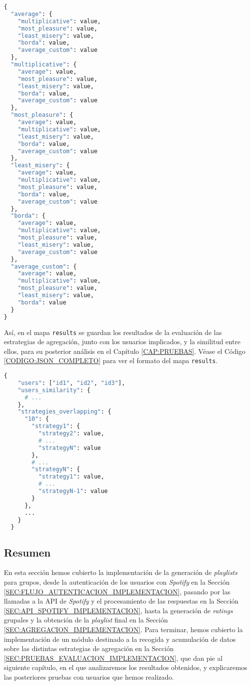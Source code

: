 \begin{lstlisting}[language=python, caption=Diccionario de similitud entre estrategias para una duración, label=CODIGO:SIMILITUD_ESTRATEGIAS]
{
  "average": {
    "multiplicative": value,
    "most_pleasure": value,
    "least_misery": value,
    "borda": value,
    "average_custom": value
  },
  "multiplicative": {
    "average": value,
    "most_pleasure": value,
    "least_misery": value,
    "borda": value,
    "average_custom": value
  },
  "most_pleasure": {
    "average": value,
    "multiplicative": value,
    "least_misery": value,
    "borda": value,
    "average_custom": value
  },
  "least_misery": {
    "average": value,
    "multiplicative": value,
    "most_pleasure": value,
    "borda": value,
    "average_custom": value
  },
  "borda": {
    "average": value,
    "multiplicative": value,
    "most_pleasure": value,
    "least_misery": value,
    "average_custom": value
  },
  "average_custom": {
    "average": value,
    "multiplicative": value,
    "most_pleasure": value,
    "least_misery": value,
    "borda": value
  }
}

\end{lstlisting}

Así, en el mapa \texttt{results} se guardan los resultados de la evaluación de las estrategias de agregación, junto con los usuarios 
implicados, y la similitud entre ellos, para su posterior análisis en el Capítulo \ref{CAP:PRUEBAS}. Véase el Código \ref{CODIGO:JSON_COMPLETO}
para ver el formato del mapa \texttt{results}.

\begin{lstlisting}[language=python, caption=Formato del mapa \texttt{results}, label=CODIGO:JSON_COMPLETO]
  {
    "users": ["id1", "id2", "id3"],
    "users_similarity": {
      # ...
    },
    "strategies_overlapping": {
      "10": {
        "strategy1": {
          "strategy2": value, 
          # ...
          "strategyN": value
        },
        # ...
        "strategyN": {
          "strategy1": value, 
          # ...
          "strategyN-1": value
        }
      },
      ...
    }
  }
\end{lstlisting}

\subsection{Resumen}

En esta sección hemos cubierto la implementación de la generación de \textit{playlists} para grupos, desde la autenticación de los usuarios
con \textit{Spotify} en la Sección \ref{SEC:FLUJO_AUTENTICACION_IMPLEMENTACION}, pasando por las llamadas a la API de \textit{Spotify} y el procesamiento de las respuestas
en la Sección \ref{SEC:API_SPOTIFY_IMPLEMENTACION}, hasta la generación de \textit{ratings} grupales y la obtención de la \textit{playlist} final en la Sección \ref{SEC:AGREGACION_IMPLEMENTACION}.
Para terminar, hemos cubierto la implementación de un módulo destinado a la recogida y acumulación de datos sobre las distintas estrategias de agregación en la 
Sección \ref{SEC:PRUEBAS_EVALUACION_IMPLEMENTACION}, que dan pie al siguiente capítulo, en el que analizaremos los resultados obtenidos, y explicaremos las posteriores
pruebas con usuarios que hemos realizado.